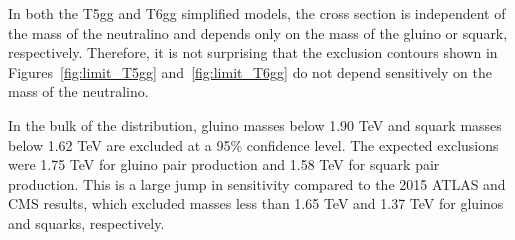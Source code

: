 In both the T5gg and T6gg simplified models, the cross section is independent of the mass of the neutralino and 
depends only on the mass of the gluino or squark, respectively. Therefore, it is not surprising that the exclusion contours
shown in Figures~\ref{fig:limit_T5gg} and~\ref{fig:limit_T6gg}
do not depend sensitively on the mass of the neutralino. 

In the bulk of the distribution, gluino masses below 1.90 TeV and squark masses below 
1.62 TeV are excluded at a 95\% confidence level. The expected exclusions were
1.75 TeV for gluino pair production and 1.58 TeV for squark pair production. 
This is a large jump in sensitivity compared to the 2015 ATLAS and CMS results, which excluded 
masses less than 1.65 TeV and 1.37 TeV for gluinos and squarks, respectively. 


